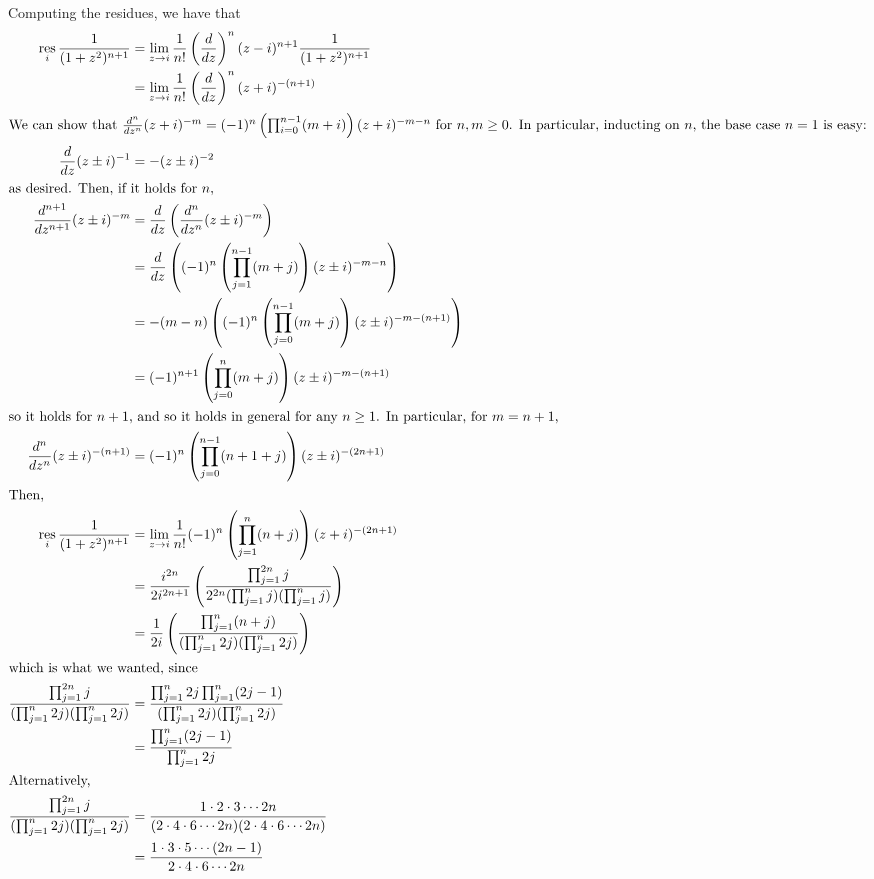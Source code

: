 \documentclass[12pt,letterpaper]{article}
\theoremstyle{definition}
\DeclareMathOperator{\res}{res}
\begin{document}
Computing the residues, we have that
\begin{align*}
  \res_{i}\frac{1}{(1+z^{2})^{n+1}} &= \lim_{z \rightarrow i} \frac{1}{n!}\left(\frac{d}{dz}\right)^{n}(z-i)^{n+1}\frac{1}{(1+z^{2})^{n+1}} \\
                                    &= \lim_{z \rightarrow i} \frac{1}{n!}\left(\frac{d}{dz}\right)^{n}(z+i)^{-(n+1)} \\
  \intertext{We can show that $\frac{d^{n}}{dz^{n}}(z+i)^{-m} = (-1)^{n}\left(\prod_{i=0}^{n-1}(m + i)\right)(z+i)^{-m - n}$ for $n,m \geq 0$. In particular, inducting on $n$, the base case $n = 1$ is easy:}
  \frac{d}{dz}(z \pm i)^{-1} &= -(z \pm i)^{-2} \\
  \intertext{as desired. Then, if it holds for $n$,}
  \frac{d^{n+1}}{dz^{n+1}}(z \pm i)^{-m} &= \frac{d}{dz}\left(\frac{d^{n}}{dz^{n}}(z \pm i)^{-m}\right) \\
                                    &= \frac{d}{dz}\left((-1)^{n}\left(\prod_{j=1}^{n-1}(m + j)\right)(z \pm i)^{-m - n}\right) \\
                                    &= -(m-n)\left((-1)^{n}\left(\prod_{j=0}^{n-1}(m + j)\right)(z \pm i)^{-m - (n+1)}\right) \\
                                    &= (-1)^{n+1}\left(\prod_{j=0}^{n}(m + j)\right)(z \pm i)^{-m - (n+1)} \\
  \intertext{so it holds for $n+1$, and so it holds in general for any $n \geq 1$. In particular, for $m = n + 1$,}
  \frac{d^{n}}{dz^{n}}(z \pm i)^{-(n+1)} &= (-1)^{n}\left(\prod_{j=0}^{n-1}(n+1 + j)\right)(z \pm i)^{-(2n+1)} \\
  \intertext{Then, }
  \res_{i}\frac{1}{(1+z^{2})^{n+1}} &= \lim_{z \rightarrow i} \frac{1}{n!} (-1)^{n} \left(\prod_{j=1}^{n}(n + j)\right)(z + i)^{-(2n + 1)} \\
                                    &= \frac{i^{2n}}{2i^{2n+1}}\left(\frac{\prod_{j=1}^{2n}j}{2^{2n}(\prod_{j=1}^{n}j)(\prod_{j=1}^{n}j)}\right) \\
                                    &=\frac{1}{2i}\left(\frac{\prod_{j=1}^{n}(n+j)}{(\prod_{j=1}^{n}2j)(\prod_{j=1}^{n}2j)}\right) \\
  \intertext{which is what we wanted, since}
  \frac{\prod_{j=1}^{2n}j}{(\prod_{j=1}^{n}2j)(\prod_{j=1}^{n}2j)} &= \frac{\prod_{j=1}^{n}2j\prod_{j=1}^{n}(2j - 1)}{(\prod_{j=1}^{n}2j)(\prod_{j=1}^{n}2j)} \\
                                    &= \frac{\prod_{j=1}^{n}(2j - 1)}{\prod_{j=1}^{n}2j} \\
  \intertext{Alternatively,}
  \frac{\prod_{j=1}^{2n}j}{(\prod_{j=1}^{n}2j)(\prod_{j=1}^{n}2j)} &= \frac{1 \cdot 2 \cdot 3 \cdots 2n}{(2 \cdot 4 \cdot 6 \cdots 2n)(2 \cdot 4 \cdot 6 \cdots 2n)} \\
                                    &= \frac{1 \cdot 3 \cdot 5 \cdots (2n - 1)}{2 \cdot 4 \cdot 6 \cdots 2n}
\end{align*}
\end{document}
